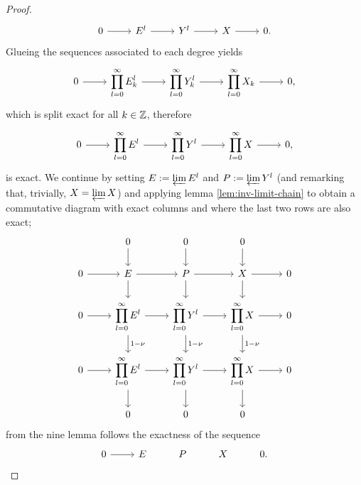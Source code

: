 \begin{proof}
\[\begin{tikzcd}
        0 & {E^l} & {Y^l} & X & {0.}
        \arrow[from=1-1, to=1-2]
        \arrow[from=1-2, to=1-3]
        \arrow[from=1-3, to=1-4]
        \arrow[from=1-4, to=1-5]
    \end{tikzcd}\]
    Glueing the sequences associated to each degree yields 
    \[\begin{tikzcd}
        0 & {\displaystyle\prod_{l= 0}^{\infty} E^l_k} & {\displaystyle\prod_{l= 0}^{\infty} Y^l_k} & {\displaystyle\prod_{l= 0}^{\infty} X_k} & {0,}
        \arrow[from=1-1, to=1-2]
        \arrow[from=1-2, to=1-3]
        \arrow[from=1-3, to=1-4]
        \arrow[from=1-4, to=1-5]
    \end{tikzcd}\]
    which is split exact for all $k \in \mathbb{Z}$, therefore
    \[\begin{tikzcd}
        0 & {\displaystyle\prod_{l= 0}^{\infty} E^l} & {\displaystyle\prod_{l= 0}^{\infty} Y^l} & {\displaystyle\prod_{l= 0}^{\infty} X} & {0,}
        \arrow[from=1-1, to=1-2]
        \arrow[from=1-2, to=1-3]
        \arrow[from=1-3, to=1-4]
        \arrow[from=1-4, to=1-5]
    \end{tikzcd}\]
    is exact. We continue by setting $E := \varprojlim E^l$ and $P:= \varprojlim Y^l$ (and remarking that, trivially, $X = \varprojlim X$) and applying lemma \ref{lem:inv-limit-chain} to obtain a commutative diagram with exact columns and where the last two rows are also exact;
    \[\begin{tikzcd}
        & 0 \arrow[d] & 0 \arrow[d] & 0 \arrow[d] & \\
        0 \arrow[r] 
        & E \arrow[r] \arrow[d] 
        & P \arrow[r] \arrow[d] 
        & X \arrow[r] \arrow[d] 
        & 0 \\
        0 \arrow[r] 
        & \displaystyle\prod_{l = 0} ^{\infty} E^l \arrow[r] \arrow[d, "1-\nu"] 
        & \displaystyle\prod_{l = 0} ^{\infty} Y^l \arrow[r] \arrow[d, "1-\nu"] 
        & \displaystyle\prod_{l = 0} ^{\infty} X \arrow[r] \arrow[d, "1-\nu"] 
        & 0 \\
        0 \arrow[r] 
        & \displaystyle\prod_{l = 0} ^{\infty} E^l \arrow[r] \arrow[d] 
        & \displaystyle\prod_{l = 0} ^{\infty} Y^l \arrow[r] \arrow[d] 
        & \displaystyle\prod_{l = 0} ^{\infty} X \arrow[r] \arrow[d] 
        & 0 \\
        & 0 & 0 & 0 &
    \end{tikzcd}\]
    from the nine lemma follows the exactness of the sequence
    \[\begin{tikzcd}
        0 & E & P & X & {0.}
        \arrow[from=1-1, to=1-2]

\end{tikzcd}\]
\end{proof}
